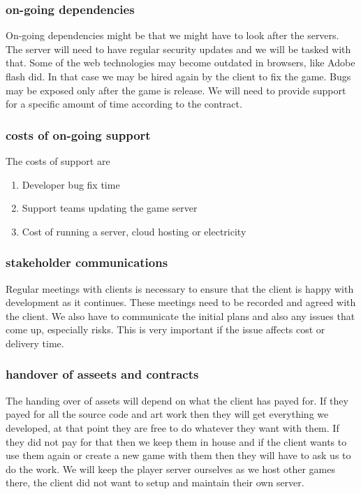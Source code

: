 \documentclass{article}
\begin{document}
\subsubsection{on-going dependencies}
On-going dependencies might be that we might have to look after the servers. The server will need to have regular security updates and we will be tasked with that.
Some of the web technologies may become outdated in browsers, like Adobe flash did. In that case we may be hired again by the client to fix the game.
Bugs may be exposed only after the game is release. We will need to provide support for a specific amount of time according to the contract.


\subsubsection{costs of on-going support}
The costs of support are
\begin{enumerate}
	\item Developer bug fix time
	\item Support teams updating the game server
	\item Cost of running a server, cloud hosting or electricity
\end{enumerate}	

\subsubsection{stakeholder communications}
Regular meetings with clients is necessary to ensure that the client is happy with development as it continues. These meetings need to be recorded and agreed with the client.
We also have to communicate the initial plans and also any issues that come up, especially risks. This is very important if the issue affects cost or delivery time.

\subsubsection{handover of asseets  and contracts}
The handing over of assets will depend on what the client has payed for.
If they payed for all the source code and art work then they will get everything we developed, at that point they are free to do whatever they want with them. If they did not pay for that then we keep them in house and if the client wants to use them again or create a new game with them then they will have to ask us to do the work.
We will keep the player server ourselves as we host other games there, the client did not want to setup and maintain their own server.
\end{document}
